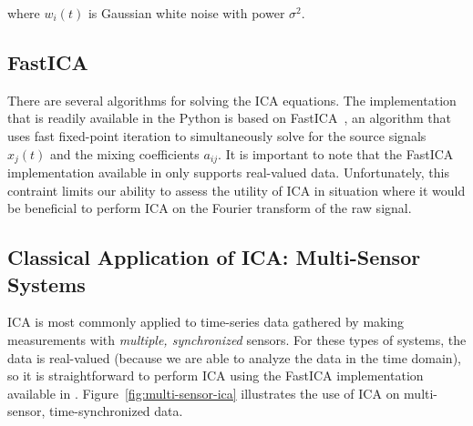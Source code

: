 \documentclass[10pt]{article}
\begin{document}
\noindent where $w_i(t)$ is Gaussian white noise with power $\sigma^2$.

\subsection*{FastICA}
There are several algorithms for solving the ICA equations. The implementation that is
readily available in the  Python is based on
FastICA~\cite{hyvarinen:1999, sklearn-fastica}, an algorithm that uses fast fixed-point
iteration to simultaneously solve for the source signals $x_j(t)$ and the mixing
coefficients $a_{ij}$. It is important to note that the FastICA implementation available
in  only supports real-valued data. Unfortunately, this contraint limits
our ability to assess the utility of ICA in situation where it would be beneficial to
perform ICA on the Fourier transform of the raw signal.

\subsection*{Classical Application of ICA: Multi-Sensor Systems}
ICA is most commonly applied to time-series data gathered by making measurements with
\emph{multiple, synchronized} sensors. For these types of systems, the data is real-valued
(because we are able to analyze the data in the time domain), so it is straightforward to
perform ICA using the FastICA implementation available in .
Figure~\ref{fig:multi-sensor-ica} illustrates the use of ICA on multi-sensor,
time-synchronized data.
\end{document}

